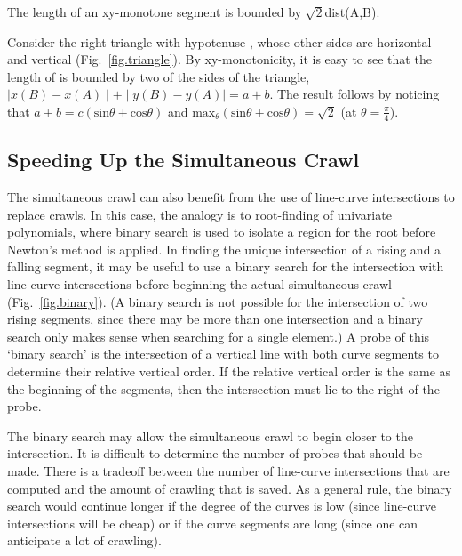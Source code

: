 \begin{lemma}
\label{lem-bound}
The length of an xy-monotone segment  is bounded by $\sqrt{2}$dist(A,B).
\end{lemma}
Consider the right triangle with hypotenuse , whose other sides are horizontal
and vertical (Fig.~\ref{fig.triangle}).
By xy-monotonicity, it is easy to see that the length of  is bounded by
two of the sides of the triangle, $\mid x(B) - x(A) \mid + \mid y(B) - y(A) \mid = a+b$.
The result follows by noticing that $a+b = c(\mbox{sin}\theta + \mbox{cos}\theta)$
and $\mbox{max}_{\theta} (\mbox{sin}\theta + \mbox{cos}\theta) = \sqrt{2}$ 
(at $\theta = \frac{\pi}{4}$).
\QED


\subsection{Speeding Up the Simultaneous Crawl}
\label{sub-linecurve2}

The simultaneous crawl can also benefit from the use of line-curve intersections to replace 
crawls.
In this case, the analogy is to root-finding of univariate polynomials, where binary search 
is used to isolate a region for the root before Newton's method is applied.
In finding the unique intersection of a rising and a falling segment, it may be useful to 
use a binary search for the intersection with line-curve intersections
before beginning the actual simultaneous crawl (Fig.~\ref{fig.binary}).
(A binary 
	search is not possible for the intersection of two rising segments, since
	there may be more than one intersection and a binary search only makes sense when
	searching for a single element.)
A probe of this `binary search' is the intersection of a vertical line with both curve 
segments to determine their relative vertical order.  
If the relative vertical order is the same as the beginning of the segments, 
then the intersection must lie to the right of the probe.


The binary search may allow the simultaneous crawl to begin closer to the intersection.
It is difficult to determine the number of probes that should be made.
There is a tradeoff between the number of line-curve intersections
that are computed and the amount of crawling that is saved.
As a general rule, the binary search would continue longer if the degree
of the curves is low (since line-curve intersections will be cheap) or
if the curve segments are long (since one can anticipate a lot of crawling).

